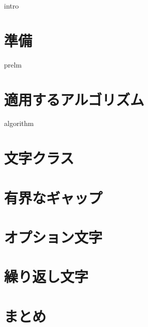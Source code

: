 \documentclass[12pt, dvipdfmx]{beamer}
\begin{document}
\maketitle
{}

{intro}
\section{準備}
{prelm}
\section{適用するアルゴリズム}
{algorithm}
\section{文字クラス}

\section{有界なギャップ}
%
\section{オプション文字}
%
\section{繰り返し文字}
%
\section{まとめ}
%
\end{document}
